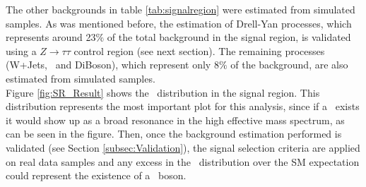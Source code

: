  \begin{table}[ht] 
    \caption{Background yields in signal region and yields in control region C.}
  \label{tab:signalregion}
 \end{table} 


\noindent The other backgrounds in table \ref{tab:signalregion} were estimated from 
simulated samples. As was mentioned before, the estimation of Drell-Yan processes, 
which represents around 23$\%$ of the total background in the signal region,
is validated using a $Z \rightarrow \tau\tau$ control region (see next section). 
The remaining processes (W+Jets, \ttbar~and DiBoson), which represent only  
8$\%$ of the background, are also estimated from simulated samples.\\

\noindent Figure \ref{fig:SR_Result} shows the \mass~distribution in the 
signal region. This distribution represents the most important plot for this analysis, since if a 
\Zprime~exists it would show up as a broad resonance in the high effective 
mass spectrum, as can be seen in the figure. Then, once the 
background estimation performed is validated (see Section \ref{subsec:Validation}), 
the signal selection criteria are applied on real data samples and
any excess in the \mass~distribution over the SM expectation 
could represent the existence of a \Zprime~boson. \\

